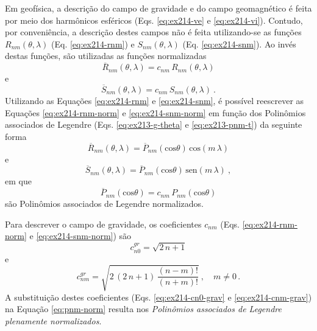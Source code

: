\documentclass[10pt,a4paper,fleqn]{article}
\begin{document}
Em geof\'{i}sica, a descri\c{c}\~{a}o do campo de gravidade e do campo geomagn\'{e}tico \'{e} feita por
meio dos harm\^{o}nicos esf\'{e}ricos (Eqs. \ref{eq:ex214-ve} e \ref{eq:ex214-vi}). Contudo, por 
conveni\^{e}ncia, a descri\c{c}\~{a}o destes campos n\~{a}o \'{e} feita utilizando-se as fun\c{c}\~{o}es 
$R_{nm}(\theta, \lambda)$ (Eq. \ref{eq:ex214-rnm}) e $S_{nm}(\theta, \lambda)$ 
(Eq. \ref{eq:ex214-snm}). Ao inv\'{e}s destas fun\c{c}\~{o}es, s\~{a}o utilizadas as fun\c{c}\~{o}es 
normalizadas
\begin{equation}
\overline{R}_{nm}(\theta,\lambda) = c_{nm} \, R_{nm}(\theta,\lambda)
\label{eq:ex214-rnm-norm}
\end{equation}
e
\begin{equation}
\overline{S}_{nm}(\theta,\lambda) = c_{nm} \, S_{nm}(\theta,\lambda) \: .
\label{eq:ex214-snm-norm}
\end{equation}
Utilizando as Equa\c{c}\~{o}es \ref{eq:ex214-rnm} e \ref{eq:ex214-snm}, \'{e}
poss\'{i}vel reescrever as Equa\c{c}\~{o}es \ref{eq:ex214-rnm-norm} e 
\ref{eq:ex214-snm-norm} em fun\c{c}\~{a}o dos Polin\^{o}mios associados
de Legendre (Eqs. \ref{eq:ex213-g-theta} e \ref{eq:ex213-pnm-t}) da
seguinte forma
\begin{equation}
\overline{R}_{nm}(\theta,\lambda) = \overline{P}_{nm}(\text{cos}\theta) \, \text{cos}(m \, \lambda)
\label{eq:ex214-rnm-pnm-norm}
\end{equation}
e
\begin{equation}
\overline{S}_{nm}(\theta,\lambda) = \overline{P}_{nm}(\text{cos}\theta) \, \text{sen}(m \, \lambda) \: ,
\label{eq:ex214-snm-pnm-norm}
\end{equation}
em que
\begin{equation}
\overline{P}_{nm}(\text{cos}\theta) = c_{nm} \, P_{nm}(\text{cos}\theta)
\label{eq:pnm-norm}
\end{equation}
s\~{a}o Polin\^{o}mios associados de Legendre normalizados.

Para descrever o campo de gravidade, os coeficientes $c_{nm}$ 
(Eqs. \ref{eq:ex214-rnm-norm} e \ref{eq:ex214-snm-norm}) são 
\begin{equation}
c_{n0}^{gr} = \sqrt{2 \, n + 1}
\label{eq:ex214-cn0-grav}
\end{equation}
e
\begin{equation}
c_{nm}^{gr} = \sqrt{2 \, (2 \, n + 1) \, \dfrac{(n - m)!}{(n + m)!}} \: , \quad m \neq 0 \, .
\label{eq:ex214-cnm-grav}
\end{equation}
A substitui\c{c}\~{a}o destes coeficientes (Eqs. \ref{eq:ex214-cn0-grav} e
\ref{eq:ex214-cnm-grav}) na Equa\c{c}\~{a}o \ref{eq:pnm-norm} resulta
nos \textit{Polin\^{o}mios associados de Legendre plenamente normalizados}.
\end{document}

